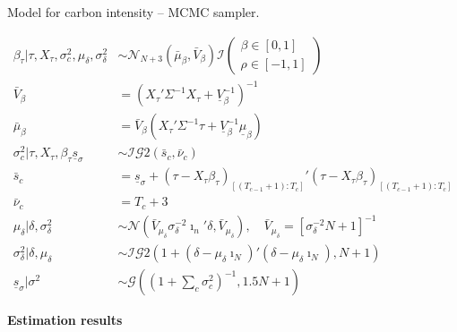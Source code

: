 \documentclass[notes,blackandwhite,mathsans,usenames,dvipsnames]{beamer}
\begin{document}
\begin{frame}{Model for carbon intensity -- MCMC sampler.}

\small
\begin{align*}
\beta_\tau|\tau,X_\tau,\sigma_c^2,\mu_\delta,\sigma_\delta^2 &\sim\mathcal{N}_{N+3}\left(\bar{\mu}_\beta, \bar{V}_\beta\right)\mathcal{I}\left(\begin{array}{c} \beta\in[0,1]\\ \rho\in[-1,1] \end{array}\right)\\
\bar{V}_\beta&= \left( X_\tau'\Sigma^{-1}X_\tau + \underline{V}_\beta^{-1}\right)^{-1}\\
\bar{\mu}_\beta&= \bar{V}_\beta\left( X_\tau'\Sigma^{-1}\tau + \underline{V}_\beta^{-1}\underline{\mu}_\beta\right)\\[1ex]
\sigma_c^2|\tau,X_\tau,\beta_\tau\underline{s}_\sigma&\sim\mathcal{IG}2(\bar{s}_c,\bar{\nu}_c)\\
\bar{s}_c &= \underline{s}_\sigma + (\tau-X_\tau \beta_\tau)_{[(T_{c-1}+1):T_c]}'(\tau -X_\tau \beta_\tau)_{[(T_{c-1}+1):T_c]}\\
\bar{\nu}_c &= T_c+3 \\[1ex]
\mu_\delta|\delta,\sigma_\delta^2&\sim\mathcal{N}\left( \bar{V}_{\mu_\delta} \sigma_\delta^{-2}\imath_n'\delta, \bar{V}_{\mu_\delta} \right),\quad \bar{V}_{\mu_\delta}=[\sigma_\delta^{-2}N +1]^{-1}\\
\sigma_\delta^2|\delta,\mu_\delta&\sim\mathcal{IG}2(1+(\delta-\mu_\delta\imath_N)'(\delta-\mu_\delta\imath_N),N+1)\\
\underline{s}_\sigma|\sigma^2&\sim\mathcal{G}\left(\left(1+\sum_c\sigma_c^2\right)^{-1}, 1.5N+1\right)
\end{align*}

\end{frame}










{
\begin{frame}

\begin{adjustwidth}{-0.5cm}{0cm}
\vspace{8.3cm}\Large
\textbf{{\color{yel}Estimation} {\color{blu}results}}
\end{adjustwidth}

\end{frame}
}
\end{document}

